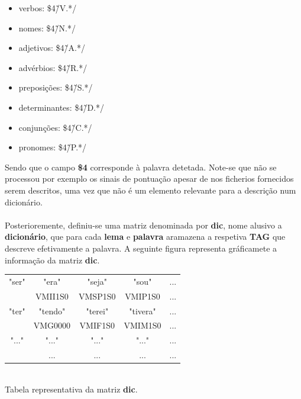 \documentclass[11pt,a4paper]{report}%
\begin{document}
\begin{itemize}
  \item verbos: \$4\~/V.*/
  \item nomes: \$4\~/N.*/ 
  \item adjetivos: \$4\~/A.*/ 
  \item advérbios: \$4\~/R.*/
  
  \item preposições: \$4\~/S.*/
  \item determinantes: \$4\~/D.*/
  \item conjunções: \$4\~/C.*/
  \item pronomes: \$4\~/P.*/
\end{itemize}

Sendo que o campo \textbf{\$4} corresponde à palavra detetada. Note-se que não se processou por exemplo os sinais de pontuação apesar de nos ficherios fornecidos serem descritos, uma vez que não é um elemento relevante para a descrição num dicionário.
\\\\
Posterioremente, definiu-se uma matriz denominada por \textbf{dic}, nome alusivo a \textbf{dicionário}, que para cada \textbf{lema} e \textbf{palavra} aramazena a respetiva \textbf{TAG} que descreve efetivamente a palavra. A seguinte figura representa gráficamete a informação da matriz \textbf{dic}.

\begin{center}
\begin{tabular}{ |c|c|c|c|c| } 
 \hline
"ser"  & "era" & "seja" & "sou" & ...\\ 
     & VMII1S0 & VMSP1S0 & VMIP1S0 &  ...\\
 \hline
"ter"  & "tendo" & "terei" & "tivera" & ...\\ 
     & VMG0000 & VMIF1S0 & VMIM1S0 &  ...\\
\hline
"..."  & "..." & "..." & "..." & ...\\ 
     & ... & ... & ... &  ...\\
\hline
\end{tabular}
\caption{\label{tab:table-name}\\Tabela representativa da matriz \textbf{dic}.}
\end{center}
\end{document}
